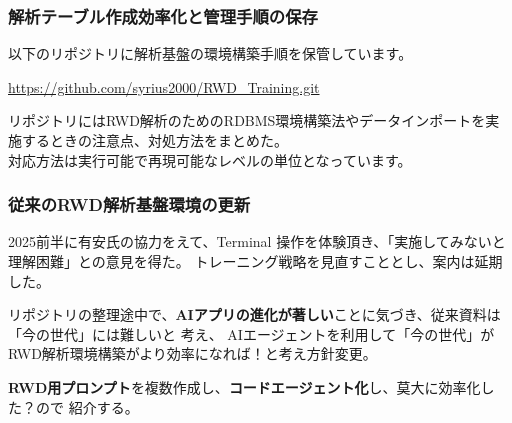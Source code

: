 \documentclass[uplatex,dvipdfmx,9pt,a4paper]{beamer}
\begin{document}
\begin{frame}%
  \frametitle{解析テーブル作成効率化と管理手順の保存}

  以下のリポジトリに解析基盤の環境構築手順を保管しています。
  \vspace{0.5cm}

  \begin{center}
    \url{https://github.com/syrius2000/RWD_Training.git}
  \end{center}
  \vspace{0.5cm}

リポジトリにはRWD解析のためのRDBMS環境構築法やデータインポートを実施するときの注意点、対処方法をまとめた。\\

対応方法は実行可能で再現可能なレベルの単位となっています。

\end{frame}

\begin{frame}%
  \frametitle{従来のRWD解析基盤環境の更新}

  2025前半に有安氏の協力をえて、Terminal
  操作を体験頂き、｢実施してみないと理解困難」との意見を得た。
  トレーニング戦略を見直すこととし、案内は延期した。
  \vspace{0.5cm}

  リポジトリの整理途中で、\textbf{AIアプリの進化が著しい}ことに気づき、従来資料は「今の世代」には難しいと
  考え、 AIエージェントを利用して「今の世代」がRWD解析環境構築がより効率になれば！と考え方針変更。
 \vspace{0.5cm}

  \textbf{RWD用プロンプト}を複数作成し、\textbf{コードエージェント化}し、莫大に効率化した？ので
  紹介する。

\end{frame}
\end{document}
